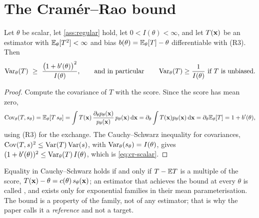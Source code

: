 
\section{The Cram\'er--Rao bound}

\begin{theorem}
\label{thm:cr-scalar}
Let $\theta$ be scalar, let \cref{ass:regular} hold, let $0<I(\theta)<\infty$, and let
$T(\mathbf{x})$ be an estimator with $\mathbb{E}_\theta[T^2]<\infty$ and bias $b(\theta)=\mathbb{E}_\theta[T]-\theta$
differentiable with (R3). Then
\begin{equation}
  \Var_\theta(T)\ \ge\ \frac{\bigl(1+b'(\theta)\bigr)^2}{I(\theta)},
  \qquad\text{and in particular}\qquad \Var_\theta(T)\ge\frac1{I(\theta)}\ \text{if $T$ is unbiased.}
  \label{eq:cr-scalar}
\end{equation}
\end{theorem}
\begin{proof}
Compute the covariance of $T$ with the score. Since the score has mean zero,
\[
  \operatorname{Cov}_\theta(T,s_\theta)=\mathbb{E}_\theta[T\,s_\theta]=\int T(\mathbf{x})\,\frac{\partial_\theta p_\theta(\mathbf{x})}{p_\theta(\mathbf{x})}\,p_\theta(\mathbf{x})\,\mathrm{d}\mathbf{x}
  =\partial_\theta\int T(\mathbf{x})p_\theta(\mathbf{x})\,\mathrm{d}\mathbf{x}=\partial_\theta\mathbb{E}_\theta[T]=1+b'(\theta),
\]
using (R3) for the exchange. The Cauchy--Schwarz inequality for covariances,
$\operatorname{Cov}(T,s)^2\le\operatorname{Var}(T)\operatorname{Var}(s)$, with $\operatorname{Var}_\theta(s_\theta)=I(\theta)$, gives
$(1+b'(\theta))^2\le\operatorname{Var}_\theta(T)\,I(\theta)$, which is \cref{eq:cr-scalar}.
\end{proof}

Equality in Cauchy--Schwarz holds if and only if $T-\mathbb{E} T$ is a multiple of the score,
$T(\mathbf{x})-\theta=c(\theta)\,s_\theta(\mathbf{x})$; an estimator that achieves the bound at every
$\theta$ is called , and exists only for exponential families in
their mean parameterisation. The bound is a property of the family, not of any
estimator; that is why the paper calls it a \emph{reference} and not a target.

